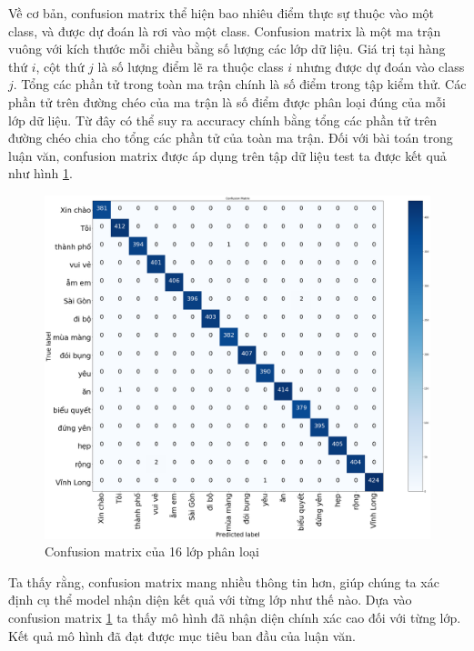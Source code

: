 Về cơ bản, confusion matrix thể hiện bao nhiêu điểm thực sự thuộc vào một class, và được dự đoán là rơi vào một class. Confusion matrix là một ma trận vuông với kích thước mỗi chiều bằng số lượng các lớp dữ liệu. Giá trị tại hàng thứ $i$, cột thứ $j$ là số lượng điểm lẽ ra thuộc class $i$ nhưng được dự đoán vào class $j$. Tổng các phần tử trong toàn ma trận chính là số điểm trong tập kiểm thử. Các phần tử trên đường chéo của ma trận là số điểm được phân loại đúng của mỗi lớp dữ liệu. Từ đây có thể suy ra accuracy chính bằng tổng các phần tử trên đường chéo chia cho tổng các phần tử của toàn ma trận. Đối với bài toán trong luận văn, confusion matrix được áp dụng trên tập dữ liệu test ta được kết quả như hình \ref{fig:confusion_matrix}.
\newpage
\FloatBarrier
\begin{figure}[htp]
\begin{center}
\includegraphics[scale=0.25]{chap6/c6_figs/confusion_matrix1.png}
\end{center}
\caption{Confusion matrix của 16 lớp phân loại}
\label{fig:confusion_matrix}
\end{figure}
\FloatBarrier

Ta thấy rằng, confusion matrix mang nhiều thông tin hơn, giúp chúng ta xác định cụ thể model nhận diện kết quả với từng lớp như thế nào. Dựa vào confusion matrix \ref{fig:confusion_matrix} ta thấy mô hình đã nhận diện chính xác cao đối với từng lớp. Kết quả mô hình đã đạt được mục tiêu ban đầu của luận văn.
\\[1cm]
